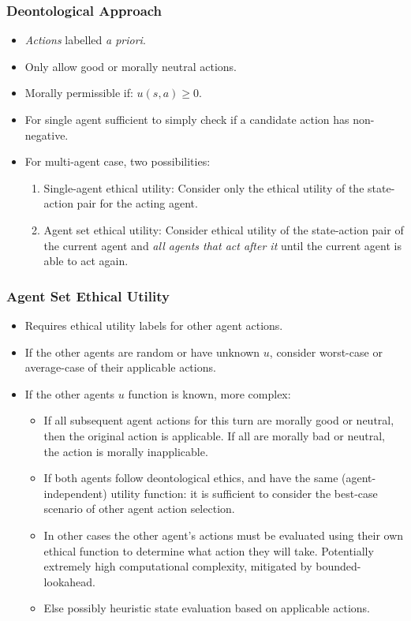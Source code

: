 \documentclass{beamer}
\begin{document}
\begin{frame}
\frametitle{Deontological Approach}
\begin{itemize}
\item \textit{Actions} labelled \textit{a priori}.
\item Only allow good or morally neutral actions.
\item Morally permissible if: $u(s,a) \geq 0$.
\item For single agent sufficient to simply check if a candidate action has non-negative.
\item For multi-agent case, two possibilities:
\begin{enumerate}
\item Single-agent ethical utility: Consider only the ethical utility of the state-action pair for the acting agent.
\item Agent set ethical utility: Consider ethical utility of the state-action pair of the current agent and \textit{all agents that act after it} until the current agent is able to act again.
\end{enumerate}
\end{itemize}
 \end{frame} 
 
 
 \begin{frame}
\frametitle{Agent Set Ethical Utility}
\begin{itemize}
\item Requires ethical utility labels for other agent actions.
\item If the other agents are random or have unknown $u$, consider worst-case or average-case of their applicable actions.
\item If the other agents $u$ function is known, more complex:
\begin{itemize}
\item If all subsequent agent actions for this turn are morally good or neutral, then the original action is applicable. If all are morally bad or neutral, the action is morally inapplicable. 
\item If both agents follow deontological ethics, and have the same (agent-independent) utility function: it is sufficient to consider the best-case scenario of other agent action selection.
\item In other cases the other agent's actions must be evaluated using their own ethical function to determine what action they will take. Potentially extremely high computational complexity, mitigated by bounded-lookahead.
\item Else possibly heuristic state evaluation based on applicable actions.
\end{itemize} 
\end{itemize}
 \end{frame} 
 
\end{document}

